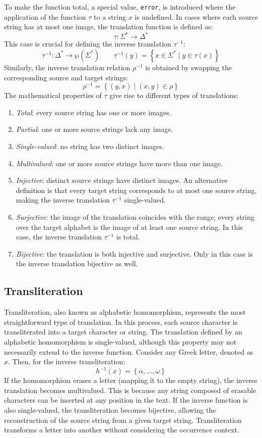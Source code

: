 To make the function total, a special value, \texttt{error}, is introduced where the application of the function $\tau$ to a string $x$ is undefined.
In cases where each source string has at most one image, the translation function is defined as:
\[ \tau : \Sigma^{\ast} \rightarrow \Delta^{\ast} \]
This case is crucial for defining the inverse translation $\tau^{-1}$:
\[ \tau^{-1} : \Delta^{\ast} \rightarrow \wp\left( \Sigma^{\ast} \right) \qquad \tau^{-1}(y) = \left\{ x \in \Sigma^{\ast} \mid  y \in \tau(x) \right\} \]
Similarly, the inverse translation relation $\rho^{-1}$ is obtained by swapping the corresponding source and target strings:
\[ \rho^{-1} = \left\{ \left( y, x \right) \mid  \left( x, y \right) \in \rho \right\} \]
The mathematical properties of $\tau$ give rise to different types of translations:
\begin{enumerate}
    \item \textit{Total}: every source string has one or more images.
    \item \textit{Partial}: one or more source strings lack any image.
    \item \textit{Single-valued}: no string has two distinct images.
    \item \textit{Multivalued}: one or more source strings have more than one image.
    \item \textit{Injective}: distinct source strings have distinct images. 
        An alternative definition is that every target string corresponds to at most one source string, making the inverse translation $\tau^{-1}$ single-valued.
    \item \textit{Surjective}: the image of the translation coincides with the range; every string over the target alphabet is the image of at least one source string.
        In this case, the inverse translation $\tau^{-1}$ is total.
    \item \textit{Bijective}: the translation is both injective and surjective. 
        Only in this case is the inverse translation bijective as well.
\end{enumerate}

\subsection{Transliteration}
Transliteration, also known as alphabetic homomorphism, represents the most straightforward type of translation.
In this process, each source character is transliterated into a target character or string.
The translation defined by an alphabetic homomorphism is single-valued, although this property may not necessarily extend to the inverse function.
Consider any Greek letter, denoted as $x$. Then, for the inverse transliteration:
\[ h^{-1}\left( x \right) = \left\{ \alpha, \dots, \omega \right\} \]
If the homomorphism erases a letter (mapping it to the empty string), the inverse translation becomes multivalued.
This is because any string composed of erasable characters can be inserted at any position in the text. 
If the inverse function is also single-valued, the transliteration becomes bijective, allowing the reconstruction of the source string from a given target string.
Transliteration transforms a letter into another without considering the occurrence context.

